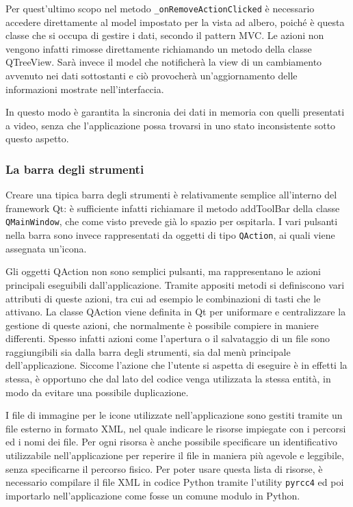 Per quest'ultimo scopo nel metodo \verb|_onRemoveActionClicked| è necessario accedere direttamente al model impostato per la vista ad albero, poiché è questa classe che si occupa di gestire i dati, secondo il pattern MVC. Le azioni non vengono infatti rimosse direttamente richiamando un metodo della classe QTreeView. Sarà invece il model che notificherà la view di un cambiamento avvenuto nei dati sottostanti e ciò provocherà un'aggiornamento delle informazioni mostrate nell'interfaccia. 

In questo modo è garantita la sincronia dei dati in memoria con quelli presentati a video, senza che l'applicazione possa trovarsi in uno stato inconsistente sotto questo aspetto.

\subsubsection{La barra degli strumenti}

Creare una tipica barra degli strumenti è relativamente semplice all'interno del framework Qt: è sufficiente infatti richiamare il metodo addToolBar della classe \verb|QMainWindow|, che come visto prevede già lo spazio per ospitarla. I vari pulsanti nella barra sono invece rappresentati da oggetti di tipo \verb|QAction|, ai quali viene assegnata un'icona. 

Gli oggetti QAction non sono semplici pulsanti, ma rappresentano le azioni principali eseguibili dall'applicazione. Tramite appositi metodi si definiscono vari attributi di queste azioni, tra cui ad esempio le combinazioni di tasti che le attivano. La classe QAction viene definita in Qt per uniformare e centralizzare la gestione di queste azioni, che normalmente è possibile compiere in maniere differenti. Spesso infatti azioni come l'apertura o il salvataggio di un file sono raggiungibili sia dalla barra degli strumenti, sia dal menù principale dell'applicazione. Siccome l'azione che l'utente si aspetta di eseguire è in effetti la stessa, è opportuno che dal lato del codice venga utilizzata la stessa entità, in modo da evitare una possibile duplicazione.

I file di immagine per le icone utilizzate nell'applicazione sono gestiti tramite un file esterno in formato XML, nel quale indicare le risorse impiegate con i percorsi ed i nomi dei file. Per ogni risorsa è anche possibile specificare un identificativo utilizzabile nell'applicazione per reperire il file in maniera più agevole e leggibile, senza specificarne il percorso fisico. Per poter usare questa lista di risorse, è necessario compilare il file XML in codice Python tramite l'utility \verb|pyrcc4| ed poi importarlo nell'applicazione come fosse un comune modulo in Python.

